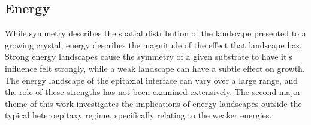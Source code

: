 \subsection{Energy}
While symmetry describes the spatial distribution of the landscape presented to a growing crystal, energy describes the magnitude of the effect that landscape has.
Strong energy landscapes cause the symmetry of a given substrate to have it's influence felt strongly, while a weak landscape can have a subtle effect on growth.
The energy landscape of the epitaxial interface can vary over a large range, and the role of these strengths has not been examined extensively.
The second major theme of this work investigates the implications of energy landscapes outside the typical heteroepitaxy regime, specifically relating to the weaker energies.